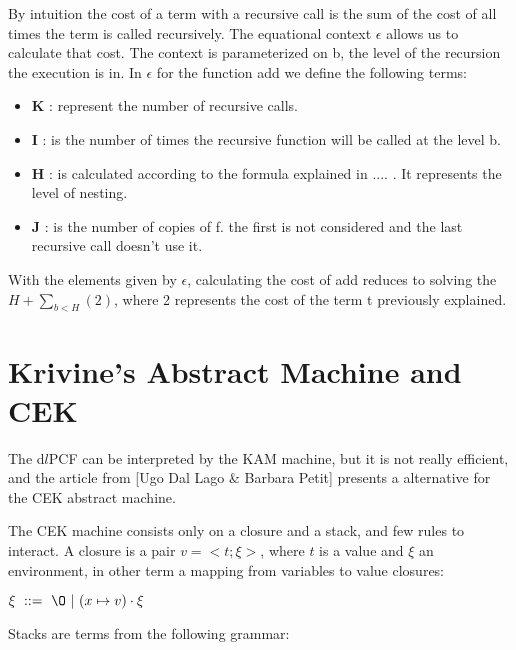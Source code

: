 \documentclass[a4paper,12pt]{article}
\begin{document}
\begin{center}
\end{center}

By intuition the cost of a term with a recursive call is the sum of
the cost of all times the term is called recursively. The equational
context $\epsilon$ allows us to calculate that cost. The context is
parameterized on b, the level of the recursion the execution is in. In 
$\epsilon$ for the function add we define the following terms:


\begin{itemize}
\item \textbf{K} : represent the number of recursive calls. 
\item \textbf{I} : is the number of times the recursive function will be called at
the level b. 
\item \textbf{H} : is calculated according to the formula explained in .... . It
represents the level of nesting.
\item \textbf{J} : is the number of copies of f. the first is not considered and
the last recursive call doesn't use it.
\end{itemize}

With the elements given by $\epsilon$, calculating the cost of add
reduces to solving the $H + \sum\limits_{b<H} (2) $, where 2
represents the cost of the term t previously explained.



\section{Krivine's Abstract Machine and CEK}

The d$l$PCF can be interpreted by the KAM machine, but it is not really
efficient, and the article from [Ugo Dal Lago \& Barbara Petit] presents a
alternative for the CEK abstract machine.

The CEK machine consists only on a closure and a stack, and few rules to
interact. A closure is a pair $v =<t;\xi>$, where $t$ is a value and $\xi$
an environment, in other term a mapping from variables to value closures:

\begin{center}
  $\xi ~ ::=~\O~|~(x \mapsto v) \cdot \xi$
\end{center}

Stacks are terms from the following grammar:
\end{document}

